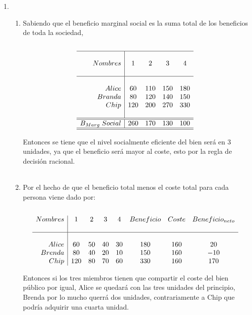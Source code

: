 \begin{enumerate}
\begin{enumerate}[\bfseries a.]
    \end{enumerate}

    \item 
	\begin{enumerate}[\bfseries 1.]

	    \item Sabiendo que el beneficio marginal social es la suma total de los beneficios de toda la sociedad, \\\\
		$$\begin{array}{r|cccc}
		    \hline\\
		    Nombres&1&2&3&4\\\\
		    \hline\\
			   Alice&60&110&150&180\\
			   Branda&80&120&140&150\\
			   Chip&120&200&270&330\\\\
			   \hline
			   \hline
		       B_{Marg}\; Social&260&170&130&100\\
		       \hline
		       \hline
		\end{array}$$

		\vspace{.4cm}
	Entonces se tiene que el nivel socialmente eficiente del bien será en 3 unidades, ya que el beneficio será mayor al coste, esto por la regla de decisión racional.\\\\

	    \item Por el hecho de que el beneficio total menos el coste total para cada persona viene dado por:\\\\
		$$\begin{array}{r|ccccccc}
		    Nombres&1&2&3&4&Beneficio&Coste&Beneficio_{neto}\\\\
		    \hline\\
			   Alice&60&50&40&30&180&160&20\\
			   Brenda&80&40&20&10&150&160&-10\\
			   Chip&120&80&70&60&330&160&170\\
		\end{array}$$

		Entonces si los tres miembros tienen que compartir el coste del bien público por igual, Alice se quedará con las tres unidades del principio, Brenda por lo mucho querrá dos unidades, contrariamente a Chip que podría adquirir una cuarta unidad.\\\\

	\end{enumerate}

\end{enumerate}
